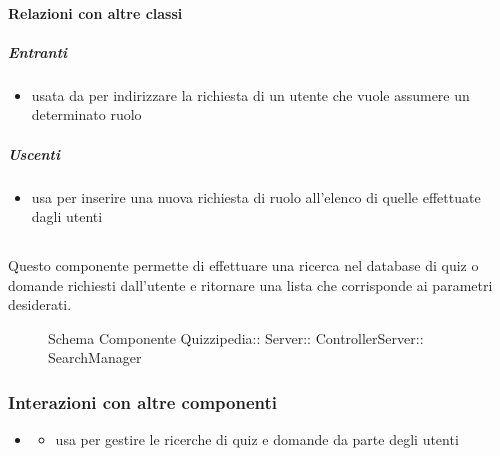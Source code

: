\paragraph{Relazioni con altre classi}
\subparagraph{Entranti}
\begin{itemize}
\item usata da  per indirizzare la richiesta di un utente che vuole assumere un determinato ruolo
\end{itemize}
\subparagraph{Uscenti}
\begin{itemize}
\item usa  per inserire una nuova richiesta di ruolo all'elenco di quelle effettuate dagli utenti
\end{itemize}
\subsection{}
Questo componente permette di effettuare una ricerca nel database di quiz o domande richiesti dall'utente e ritornare una lista che corrisponde ai parametri desiderati.
\begin{figure}[H]
\centering
\noindent{}
\caption[Schema Componente SearchManager]{Schema Componente Quizzipedia:: Server:: ControllerServer:: SearchManager}
\end{figure}
\subsubsection{Interazioni con altre componenti}
\begin{itemize}
\item {}
\begin{itemize}
\item usa  per gestire le ricerche di quiz e domande da parte degli utenti
\end{itemize}
\end{itemize}
